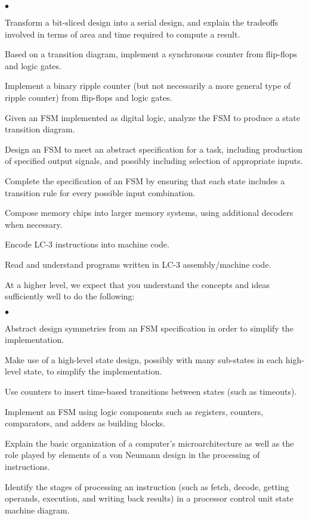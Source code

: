 \begin{list}{$\bullet$}{\setlength{\itemsep}{0pt}\setlength{\parskip}{0pt}%
\setlength{\topsep}{0pt}\setlength{\partopsep}{0pt}\setlength{\parsep}{0pt}}

\item{Transform a bit-sliced design into a serial design, and explain the 
tradeoffs involved in terms of area and time required to compute a result.}
\item{Based on a transition diagram, implement a synchronous counter from 
flip-flops and logic gates.}
\item{Implement a binary ripple counter (but not necessarily a more general 
type of ripple counter) from flip-flops and logic gates.}
\item{Given an FSM implemented as digital logic, analyze the FSM to produce 
a state transition diagram.}
\item{Design an FSM to meet an abstract specification for a task, including 
production of specified output signals, and possibly including selection 
of appropriate inputs.}
\item{Complete the specification of an FSM by ensuring that each state 
includes a transition rule for every possible input combination.}
\item{Compose memory chips into larger memory systems, using additional
decoders when necessary.}
\item{Encode \mbox{LC-3} instructions into machine code.}
\item{Read and understand programs written in \mbox{LC-3} assembly/machine code.}
\end{list}

At a higher level, we expect that you understand the concepts and ideas 
sufficiently well to do the following:

\begin{list}{$\bullet$}{\setlength{\itemsep}{0pt}\setlength{\parskip}{0pt}%
\setlength{\topsep}{0pt}\setlength{\partopsep}{0pt}\setlength{\parsep}{0pt}}

\item{Abstract design symmetries from an FSM specification in order to 
simplify the implementation.}
\item{Make use of a high-level state design, possibly with many sub-states 
in each high-level state, to simplify the implementation.}
\item{Use counters to insert time-based transitions between states (such 
as timeouts).}
\item{Implement an FSM using logic components such as registers, 
counters, comparators, and adders as building blocks.}
\item{Explain the basic organization of a computer's microarchitecture
as well as the role played by elements of a von Neumann design in the
processing of instructions.}
\item{Identify the stages of processing an instruction (such as fetch,
decode, getting operands, execution, and writing back results) in a 
processor control unit state machine diagram.}
\end{list}

